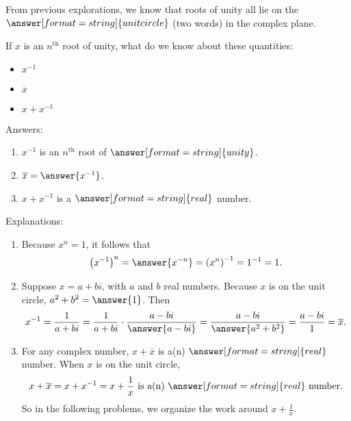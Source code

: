 \documentclass[space,nooutcomes]{ximera}
\begin{document}
\begin{problem}
From previous explorations, we know that roots of unity all lie on the $\answer[format=string]{unit circle}$ (two words) in the complex plane. 

If $x$ is an $n^\text{th}$ root of unity, what do we know about these quantities: 
\begin{itemize}
\item $x^{-1}$ 
\item $\overline{x}$
\item $x+x^{-1}$
\end{itemize}

Answers:
\begin{enumerate}
\item $x^{-1}$ is an $n^\text{th}$ root of $\answer[format=string]{unity}$.  
\item $\overline{x} = \answer{x^{-1}}$. 
\item $x+x^{-1}$ is a $\answer[format=string]{real}$ number.  
\end{enumerate}
\begin{problem}
Explanations: 
\begin{enumerate}
\item Because $x^n=1$, it follows that 
\[
\left(x^{-1}\right)^n = \answer{x^{-n}} = \left(x^n\right)^{-1} = 1^{-1} = 1. 
\]
\item Suppose $x=a+bi$, with $a$ and $b$ real numbers. Because $x$ is on the unit circle, $a^2+b^2 = \answer{1}$.  Then 
\[
x^{-1}=\frac{1}{a+bi}=\frac{1}{a+bi}\cdot\frac{a-bi}{\answer{a-bi}}=\frac{a-bi}{\answer{a^2+b^2}}=\frac{a-bi}{1}=\overline{x}.
\]
\item For any complex number, $x+\overline{x}$ is a(n) $\answer[format=string]{real}$ number.  When $x$ is on the unit circle, 
\[
x + \overline{x} = x + x^{-1} = x + \frac{1}{x}\text{ is a(n) }\answer[format=string]{real}\text{ number.}
\]
So in the following problems, we organize the work around $x + \frac{1}{x}$.  
\end{enumerate}
\end{problem}
\end{problem}
\end{document}
